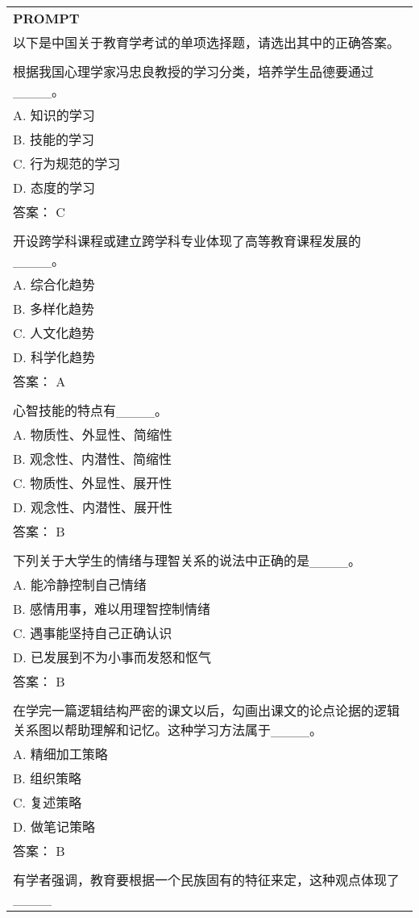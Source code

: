 \begin{table}[ht]
    \centering \small
\begin{tabular}{p{12cm}}
\toprule
\textbf{PROMPT}\\
以下是中国关于教育学考试的单项选择题，请选出其中的正确答案。
\\
\\根据我国心理学家冯忠良教授的学习分类，培养学生品德要通过\_\_\_\_。
\\A. 知识的学习
\\B. 技能的学习
\\C. 行为规范的学习
\\D. 态度的学习
\\答案： C
\\
\\开设跨学科课程或建立跨学科专业体现了高等教育课程发展的\_\_\_\_。
\\A. 综合化趋势
\\B. 多样化趋势
\\C. 人文化趋势
\\D. 科学化趋势
\\答案： A
\\
\\心智技能的特点有\_\_\_\_。
\\A. 物质性、外显性、简缩性
\\B. 观念性、内潜性、简缩性
\\C. 物质性、外显性、展开性
\\D. 观念性、内潜性、展开性
\\答案： B
\\
\\下列关于大学生的情绪与理智关系的说法中正确的是\_\_\_\_。
\\A. 能冷静控制自己情绪
\\B. 感情用事，难以用理智控制情绪
\\C. 遇事能坚持自己正确认识
\\D. 已发展到不为小事而发怒和怄气
\\答案： B
\\
\\在学完一篇逻辑结构严密的课文以后，勾画出课文的论点论据的逻辑关系图以帮助理解和记忆。这种学习方法属于\_\_\_\_。
\\A. 精细加工策略
\\B. 组织策略
\\C. 复述策略
\\D. 做笔记策略
\\答案： B
\\
\\有学者强调，教育要根据一个民族固有的特征来定，这种观点体现了\_\_\_\_

\end{tabular}
\end{table}
